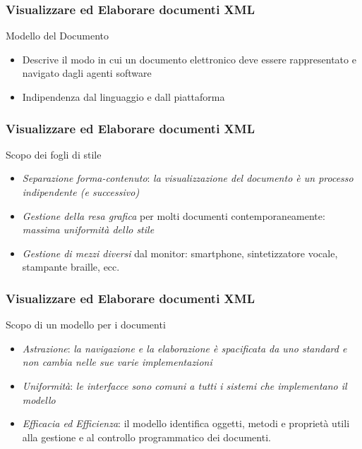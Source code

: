 \documentclass{beamer}
\begin{document}
    \begin{frame}
        \frametitle{Visualizzare ed Elaborare documenti XML}
        \addtocounter{nframe}{1}
        
        \begin{block}{Modello del Documento}
           \begin{itemize}
               \item Descrive il modo in cui un documento elettronico deve essere rappresentato e navigato dagli agenti software
               \item Indipendenza dal linguaggio e dall piattaforma
           \end{itemize}
        \end{block}
        
    \end{frame}
    
    \begin{frame}
        \frametitle{Visualizzare ed Elaborare documenti XML}
        \addtocounter{nframe}{1}
        
        \begin{block}{Scopo dei fogli di stile}
           \begin{itemize}
               \item \emph{Separazione forma-contenuto}: \textit{la visualizzazione del documento è un processo indipendente (e successivo)}
               \item \emph{Gestione della resa grafica} per molti documenti contemporaneamente: \textit{massima uniformità dello stile}
               \item \emph{Gestione di mezzi diversi} dal monitor: smartphone, sintetizzatore
               vocale, stampante braille, ecc.
           \end{itemize}
        \end{block}
        
    \end{frame}

    \begin{frame}
        \frametitle{Visualizzare ed Elaborare documenti XML}
        \addtocounter{nframe}{1}
        
        \begin{block}{Scopo di un modello per i documenti}
           \begin{itemize}
               \item \emph{Astrazione}: \textit{la navigazione e la elaborazione è spacificata da uno standard e non cambia nelle sue varie implementazioni}
               \item \emph{Uniformità}: \textit{le interfacce sono comuni a tutti i sistemi che implementano il modello}
               \item \emph{Efficacia ed Efficienza}: il modello identifica oggetti, metodi e proprietà utili alla gestione e al controllo programmatico dei documenti. 
           \end{itemize}
        \end{block}
        
    \end{frame}
\end{document}
